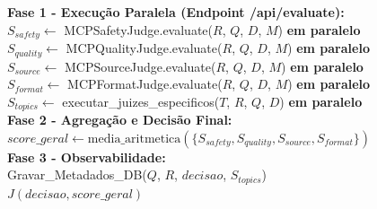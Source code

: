 \documentclass[12pt]{article}
\begin{document}
\begin{center}
\begin{framed}
\noindent
\begin{algorithm}[H]
\caption{Pipeline de Avaliação Desacoplada com Juízes}
\label{alg:judge-pipeline}
\BlankLine
\textbf{Fase 1 - Execução Paralela (Endpoint /api/evaluate):}\\
$S_{safety} \gets$ MCPSafetyJudge.evaluate($R$, $Q$, $D$, $M$) \textbf{em paralelo}\\
$S_{quality} \gets$ MCPQualityJudge.evaluate($R$, $Q$, $D$, $M$) \textbf{em paralelo}\\
$S_{source} \gets$ MCPSourceJudge.evaluate($R$, $Q$, $D$, $M$) \textbf{em paralelo}\\
$S_{format} \gets$ MCPFormatJudge.evaluate($R$, $Q$, $D$, $M$) \textbf{em paralelo}\\
$S_{topics} \gets$ executar\_juizes\_especificos($T$, $R$, $Q$, $D$) \textbf{em paralelo}\\
\BlankLine
\textbf{Fase 2 - Agregação e Decisão Final:}\\
$score\_geral \gets \text{media\_aritmetica}(\{S_{safety}, S_{quality}, S_{source}, S_{format}\})$\\
\BlankLine
\textbf{Fase 3 - Observabilidade:}\\
Gravar\_Metadados\_DB($Q$, $R$, $decisao$, $S_{topics}$)\\
\Return $J(decisao, score\_geral)$
\end{algorithm}
\end{framed}
\end{center}
\end{document}
